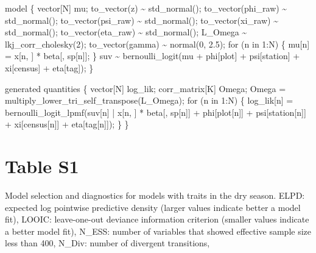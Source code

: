 \documentclass[
  12pt,
  letterpaper,
  DIV=11,
  numbers=noendperiod]{scrartcl}
\newenvironment{Shaded}{\begin{snugshade}}{\end{snugshade}}
\newcommand{\ControlFlowTok}[1]{\textcolor[rgb]{0.00,0.23,0.31}{#1}}
\newcommand{\DataTypeTok}[1]{\textcolor[rgb]{0.68,0.00,0.00}{#1}}
\newcommand{\DecValTok}[1]{\textcolor[rgb]{0.68,0.00,0.00}{#1}}
\newcommand{\FloatTok}[1]{\textcolor[rgb]{0.68,0.00,0.00}{#1}}
\newcommand{\KeywordTok}[1]{\textcolor[rgb]{0.00,0.23,0.31}{#1}}
\newcommand{\NormalTok}[1]{\textcolor[rgb]{0.00,0.23,0.31}{#1}}
\begin{document}
\begin{Shaded}
\begin{Highlighting}[]
\KeywordTok{model}\NormalTok{ \{}
  \DataTypeTok{vector}\NormalTok{[N] mu;}
\NormalTok{  to\_vector(z) \textasciitilde{} std\_normal();}
\NormalTok{  to\_vector(phi\_raw) \textasciitilde{} std\_normal();}
\NormalTok{  to\_vector(psi\_raw) \textasciitilde{} std\_normal();}
\NormalTok{  to\_vector(xi\_raw) \textasciitilde{} std\_normal();}
\NormalTok{  to\_vector(eta\_raw) \textasciitilde{} std\_normal();}
\NormalTok{  L\_Omega \textasciitilde{} lkj\_corr\_cholesky(}\DecValTok{2}\NormalTok{);}
\NormalTok{  to\_vector(gamma) \textasciitilde{} normal(}\DecValTok{0}\NormalTok{, }\FloatTok{2.5}\NormalTok{);}
  \ControlFlowTok{for}\NormalTok{ (n }\ControlFlowTok{in} \DecValTok{1}\NormalTok{:N) \{}
\NormalTok{    mu[n] = x[n, ] * beta[, sp[n]];}
\NormalTok{  \}}
\NormalTok{  suv \textasciitilde{} bernoulli\_logit(mu + phi[plot] + psi[station] + xi[census] + eta[tag]);}
\NormalTok{\}}

\KeywordTok{generated quantities}\NormalTok{ \{}
  \DataTypeTok{vector}\NormalTok{[N] log\_lik;}
  \DataTypeTok{corr\_matrix}\NormalTok{[K] Omega;}
\NormalTok{  Omega = multiply\_lower\_tri\_self\_transpose(L\_Omega);}
  \ControlFlowTok{for}\NormalTok{ (n }\ControlFlowTok{in} \DecValTok{1}\NormalTok{:N) \{}
\NormalTok{    log\_lik[n] = bernoulli\_logit\_lpmf(suv[n] | x[n, ] * beta[, sp[n]] +}
\NormalTok{      phi[plot[n]] + psi[station[n]] + xi[census[n]] + eta[tag[n]]);}
\NormalTok{  \}}
\NormalTok{\}}
\end{Highlighting}
\end{Shaded}

\newpage

\hypertarget{table-s1}{%
\section{Table S1}\label{table-s1}}

Model selection and diagnostics for models with traits in the dry
season. ELPD: expected log pointwise predictive density (larger values
indicate better a model fit), LOOIC: leave-one-out deviance information
criterion (smaller values indicate a better model fit), N\_ESS: number
of variables that showed effective sample size less than 400, N\_Div:
number of divergent transitions,
\end{document}
